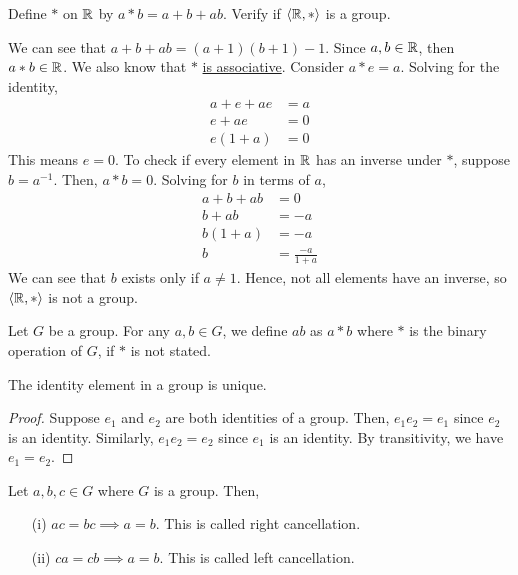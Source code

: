     \begin{example}
        Define \(*\) on \(\mathbb{R}\) by \(a * b = a + b + ab\). Verify if \(\langle \mathbb{R}, * \rangle\) is a group.

        We can see that \(a + b + ab = (a + 1)(b + 1) - 1\). Since \(a,b\in\mathbb{R}\), then \(a * b\in\mathbb{R}\). We also know that \(*\) \hyperref[exm:starAssoc]{is associative}. Consider \(a * e = a\). Solving for the identity,
        \begin{align*}
            a + e + ae &= a \\
            e + ae &= 0 \\
            e(1 + a) &= 0
        \end{align*}
        This means \(e = 0\). To check if every element in \(\mathbb{R}\) has an inverse under \(*\), suppose \(b = a^{-1}\). Then, \(a * b = 0\). Solving for \(b\) in terms of \(a\),
        \begin{align*}
            a + b + ab &= 0 \\
            b + ab &= -a \\
            b(1 + a) &= -a \\
            b &= \frac{-a}{1 + a}
        \end{align*}
        We can see that \(b\) exists only if \(a \neq 1\). Hence, not all elements have an inverse, so \(\langle \mathbb{R}, * \rangle\) is not a group. 
    \end{example}

    \begin{note}
        Let \(G\) be a group. For any \(a, b\in G\), we define \(ab\) as \(a*b\) where \(*\) is the binary operation of \(G\), if \(*\) is not stated.
    \end{note}

    \begin{thm}
        The identity element in a group is unique.
    \end{thm}

    \begin{proof}
        Suppose \(e_1\) and \(e_2\) are both identities of a group. Then, \(e_1e_2 = e_1\) since \(e_2\) is an identity. Similarly, \(e_1e_2 = e_2\) since \(e_1\) is an identity. By transitivity, we have \(e_1 = e_2\).
    \end{proof}

    \begin{thm}
        Let \(a, b, c\in G\) where \(G\) is a group. Then,
        \begin{enumerate}
            \item[(i)] \(ac = bc \implies a = b\). This is called right cancellation.
            \item[(ii)] \(ca = cb \implies a = b\). This is called left cancellation.
        \end{enumerate}
    \end{thm}

